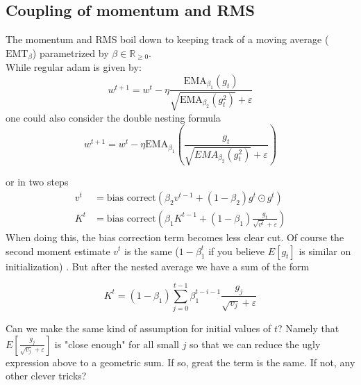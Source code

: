 \documentclass[12pt]{article}
\newcommand{\R}{\mathbb{R}}
\begin{document}
\subsection*{Coupling of momentum and RMS}
The momentum and RMS boil down to keeping track of a moving average ($\text{EMT}_{\beta}$) parametrized by $\beta\in \R_{\ge 0}$. 
\\
While regular adam is given by:
\[
w^{t+1} = w^{t} - \eta \frac{\text{EMA}_{\beta_1}(g_t)}{\sqrt{\text{EMA}_{\beta_2}(g_t ^2) } + \varepsilon  }
\] 
one could also consider the double nesting formula
\[
w^{t+1} = w^{t} - \eta \text{EMA}_{\beta_1} \left( \frac{g_t}{\sqrt{EMA_{\beta_2}(g_t^2)} + \varepsilon  } \right) 
\] 

or in two steps 
\begin{align*}
	v^{t} &= \text{bias correct}(\beta_2v^{t-1} + (1-\beta_2)g^{t}\odot g^{t})\\
	K^{t} &= \text{bias correct}(\beta_1K^{t-1} + (1-\beta_1) \frac{g_{t}}{\sqrt{v^{t}} + \varepsilon  })
\end{align*}
When doing this, the bias correction term becomes less clear cut. Of course the second moment estimate $v^{t}$ is the same ($1-\beta_1^{t} $ if you believe $E[g_t]$ is similar on initialization) . But after the nested average we have a sum of the form 

\[
	K^{t} = (1-\beta_1)\sum_{j=0}^{t-1} {\beta_1^{t-i-1} \frac{g_j}{\sqrt{v_j} + \varepsilon }}
\]

Can we make the same kind of assumption for initial values of $t$? Namely that $E[\frac{g_j}{\sqrt{v_j} + \varepsilon }]$ is "close enough" for all small $j$ so that we can reduce the ugly expression above to a geometric sum. If so, great the term is the same. If not, any other clever tricks? 
\end{document}
